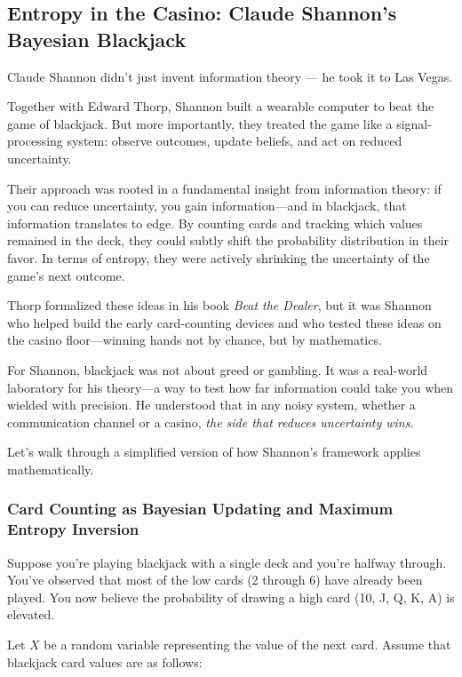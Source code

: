 \subsection{Entropy in the Casino: Claude Shannon’s Bayesian Blackjack}

Claude Shannon didn’t just invent information theory — he took it to Las Vegas.

Together with Edward Thorp, Shannon built a wearable computer to beat the game of blackjack. But more importantly, they treated the game like a signal-processing system: observe outcomes, update beliefs, and act on reduced uncertainty.

Their approach was rooted in a fundamental insight from information theory: if you can reduce uncertainty, you gain information—and in blackjack, that information translates to edge. By counting cards and tracking which values remained in the deck, they could subtly shift the probability distribution in their favor. In terms of entropy, they were actively shrinking the uncertainty of the game’s next outcome.

Thorp formalized these ideas in his book \emph{Beat the Dealer}, but it was Shannon who helped build the early card-counting devices and who tested these ideas on the casino floor—winning hands not by chance, but by mathematics.

For Shannon, blackjack was not about greed or gambling. It was a real-world laboratory for his theory—a way to test how far information could take you when wielded with precision. He understood that in any noisy system, whether a communication channel or a casino, \emph{the side that reduces uncertainty wins}.

Let’s walk through a simplified version of how Shannon’s framework applies mathematically.

\subsubsection{Card Counting as Bayesian Updating and Maximum Entropy Inversion}

Suppose you're playing blackjack with a single deck and you're halfway through. You've observed that most of the low cards (2 through 6) have already been played. You now believe the probability of drawing a high card (10, J, Q, K, A) is elevated.

Let \( X \) be a random variable representing the value of the next card. Assume that blackjack card values are as follows:

